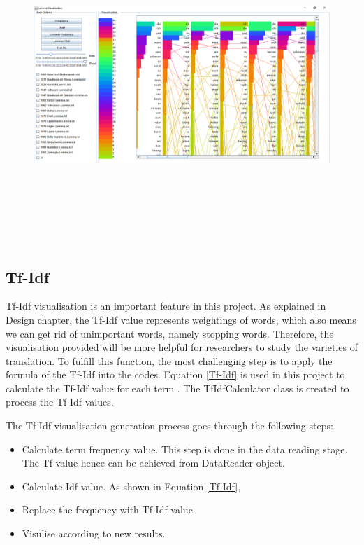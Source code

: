 \begin{figure}[H]
	\centering	
	\includegraphics[width=16cm, height=12cm]{Figs/LemmaView}\\[1ex]
	\caption{}
	\label{fig:lemmaView}
\end{figure} 

\subsection{Tf-Idf}

Tf-Idf visualisation is an important feature in this project. As explained in Design chapter, the Tf-Idf value represents weightings of words, which also means we can get rid of unimportant words, namely stopping words. Therefore, the visualisation provided will be more helpful for researchers to study the varieties of translation. To fulfill this function, the most challenging step is to apply the formula of the Tf-Idf into the codes. Equation \ref{Tf-Idf} is used in this project to calculate the Tf-Idf value for each term \cite{Asking Mohammad about the equation referance}. The TfIdfCalculator class is created to process the Tf-Idf values.

The Tf-Idf visualisation generation process goes through the following steps:

\begin{itemize}
\item \textbf{} Calculate term frequency value. This step is done in the data reading stage. The Tf value hence can be achieved from DataReader object.
\item \textbf{} Calculate Idf value. As shown in Equation \ref{Tf-Idf},
\item \textbf{} Replace the frequency with Tf-Idf value.
\item \textbf{} Visulise according to new results.
\end{itemize} 

